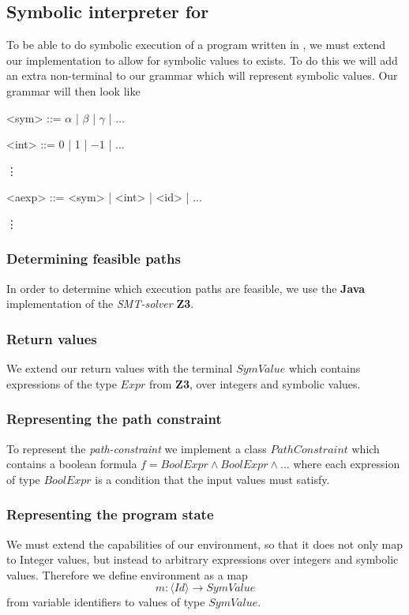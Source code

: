 \subsection{Symbolic interpreter for \simpl}

To be able to do symbolic execution of a program written in \simpl, we must extend our implementation to allow for symbolic values to exists. To do this we 
will add an extra non-terminal to our grammar which will represent symbolic values. Our grammar will then look like 

\begin{grammar}
	<sym> ::= $\alpha$ | $\beta$ | $\gamma$ | $\ldots$
	
	<int> ::= 0 | 1 | $-1$ | $\ldots$
	
	\vdots
	
	<aexp> ::= <sym> | <int> | <id> | $\ldots$
	
	\vdots
\end{grammar}

\subsubsection{Determining feasible paths}
In order to determine which execution paths are feasible, we use the \textbf{Java} implementation of the \emph{SMT-solver} \textbf{Z3}. 
\subsubsection{Return values}
We extend our return values with the terminal $SymValue$ which contains expressions of the type $Expr$ from \textbf{Z3}, over integers and symbolic values.

\subsubsection{Representing the path constraint}
To represent the \emph{path-constraint} we implement a class $PathConstraint$ which contains a boolean formula $f = BoolExpr \land BoolExpr \land ...$ where each expression of type $BoolExpr$ is a condition that the input values must satisfy. 
\\

\subsubsection{Representing the program state}
We must extend the capabilities of our environment, so that it does not only map to Integer values, but instead to arbitrary expressions over integers and symbolic values. Therefore we define environment as a map
\begin{equation*}
	m: \langle Id \rangle \rightarrow SymValue
\end{equation*}
from variable identifiers to values of type $SymValue$.

